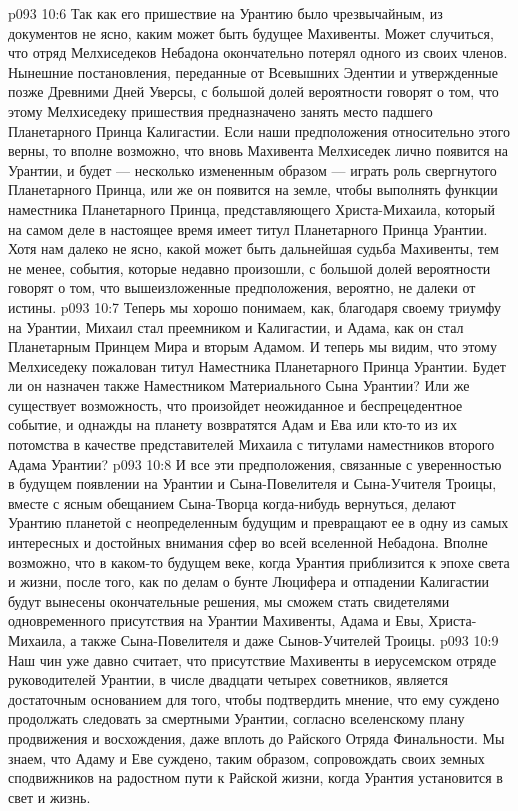 \vs p093 10:6 Так как его пришествие на Урантию было чрезвычайным, из документов не ясно, каким может быть будущее Махивенты. Может случиться, что отряд Мелхиседеков Небадона окончательно потерял одного из своих членов. Нынешние постановления, переданные от Всевышних Эдентии и утвержденные позже Древними Дней Уверсы, с большой долей вероятности говорят о том, что этому Мелхиседеку пришествия предназначено занять место падшего Планетарного Принца Калигастии. Если наши предположения относительно этого верны, то вполне возможно, что вновь Махивента Мелхиседек лично появится на Урантии, и будет --- несколько измененным образом --- играть роль свергнутого Планетарного Принца, или же он появится на земле, чтобы выполнять функции наместника Планетарного Принца, представляющего Христа\hyp{}Михаила, который на самом деле в настоящее время имеет титул Планетарного Принца Урантии. Хотя нам далеко не ясно, какой может быть дальнейшая судьба Махивенты, тем не менее, события, которые недавно произошли, с большой долей вероятности говорят о том, что вышеизложенные предположения, вероятно, не далеки от истины.
\vs p093 10:7 Теперь мы хорошо понимаем, как, благодаря своему триумфу на Урантии, Михаил стал преемником и Калигастии, и Адама, как он стал Планетарным Принцем Мира и вторым Адамом. И теперь мы видим, что этому Мелхиседеку пожалован титул Наместника Планетарного Принца Урантии. Будет ли он назначен также Наместником Материального Сына Урантии? Или же существует возможность, что произойдет неожиданное и беспрецедентное событие, и однажды на планету возвратятся Адам и Ева или кто\hyp{}то из их потомства в качестве представителей Михаила с титулами наместников второго Адама Урантии?
\vs p093 10:8 И все эти предположения, связанные с уверенностью в будущем появлении на Урантии и Сына\hyp{}Повелителя и Сына\hyp{}Учителя Троицы, вместе с ясным обещанием Сына\hyp{}Творца когда\hyp{}нибудь вернуться, делают Урантию планетой с неопределенным будущим и превращают ее в одну из самых интересных и достойных внимания сфер во всей вселенной Небадона. Вполне возможно, что в каком\hyp{}то будущем веке, когда Урантия приблизится к эпохе света и жизни, после того, как по делам о бунте Люцифера и отпадении Калигастии будут вынесены окончательные решения, мы сможем стать свидетелями одновременного присутствия на Урантии Махивенты, Адама и Евы, Христа\hyp{}Михаила, а также Сына\hyp{}Повелителя и даже Сынов\hyp{}Учителей Троицы.
\vs p093 10:9 Наш чин уже давно считает, что присутствие Махивенты в иерусемском отряде руководителей Урантии, в числе двадцати четырех советников, является достаточным основанием для того, чтобы подтвердить мнение, что ему суждено продолжать следовать за смертными Урантии, согласно вселенскому плану продвижения и восхождения, даже вплоть до Райского Отряда Финальности. Мы знаем, что Адаму и Еве суждено, таким образом, сопровождать своих земных сподвижников на радостном пути к Райской жизни, когда Урантия установится в свет и жизнь.
